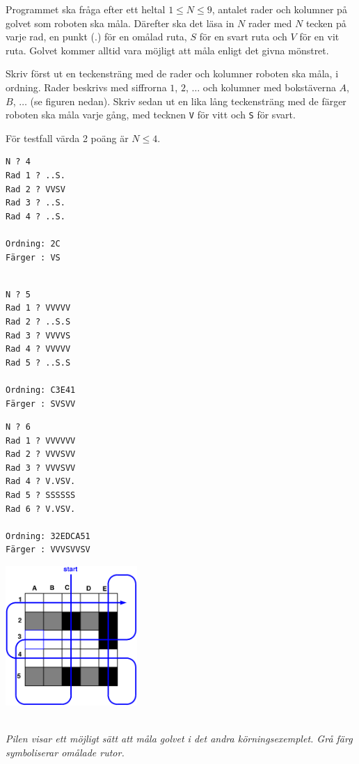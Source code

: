 Programmet ska fråga efter ett heltal $1 \leq N \leq 9$, antalet rader och kolumner på golvet som roboten ska måla. Därefter ska det läsa in $N$ rader med $N$ tecken på varje rad, en punkt ($.$) för en omålad ruta, $S$ för en svart ruta och $V$ för en vit ruta. Golvet kommer alltid vara möjligt att måla enligt det givna mönstret. 

Skriv först ut en teckensträng med de rader och kolumner roboten ska måla, i ordning.
Rader beskrivs med siffrorna $1$, $2$, $\dots$ och kolumner med bokstäverna $A$, $B$, $\dots$ (se figuren nedan). Skriv sedan ut en lika lång teckensträng med de färger roboten ska måla varje gång, med tecknen \texttt{V} för vitt och \texttt{S} för svart.

 För testfall värda 2 poäng är $N \le 4$.
\setlength\columnsep{20pt}
\begin{multicols}{3}

\begin{verbatim}
N ? 4
Rad 1 ? ..S.
Rad 2 ? VVSV
Rad 3 ? ..S.
Rad 4 ? ..S.

Ordning: 2C
Färger : VS


\end{verbatim}
\vfill
\columnbreak

\begin{verbatim}
N ? 5
Rad 1 ? VVVVV
Rad 2 ? ..S.S
Rad 3 ? VVVVS
Rad 4 ? VVVVV
Rad 5 ? ..S.S

Ordning: C3E41
Färger : SVSVV

\end{verbatim}
\vfill
\columnbreak

\begin{verbatim}
N ? 6
Rad 1 ? VVVVVV
Rad 2 ? VVVSVV
Rad 3 ? VVVSVV
Rad 4 ? V.VSV.
Rad 5 ? SSSSSS
Rad 6 ? V.VSV.

Ordning: 32EDCA51
Färger : VVVSVVSV
\end{verbatim}

\vfill
\end{multicols}
\begin{multicols}{2}
\begin{center}
  \includegraphics[width=5cm]{../skolkval/dentrottemalaren/problem_statement/golv.pdf}
\end{center}
\columnbreak
~\\ 
\emph{Pilen visar ett möjligt sätt att måla golvet i det andra körningsexemplet. Grå färg symboliserar omålade rutor.}
\vfill
\end{multicols}

